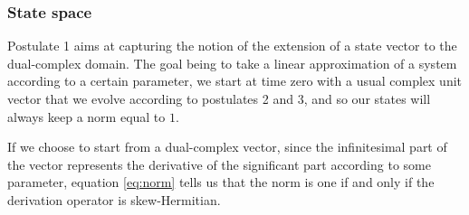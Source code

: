 \documentclass{article}
\newcommand{\R}{\mathbb{R}}
\newcommand{\e}{\epsilon}
\renewcommand{\Re}{\operatorname{Re}}
\newcommand\dstate[2]{\frac{\mathrm{d}\ket{#1}}{\mathrm{d}#2}}
\begin{document}
\subsubsection*{State space}

Postulate 1 aims at capturing the notion of the extension of a state vector to the dual-complex domain. The goal being to take a linear approximation of a system according to a certain parameter, we start at time zero with a usual complex unit vector that we evolve according to postulates 2 and 3, and so our states will always keep a norm equal to $1$.

If we choose to start from a dual-complex vector, since the infinitesimal part of the vector represents the derivative of the significant part according to some parameter, equation \ref{eq:norm} tells us that the norm is one if and only if the derivation operator is skew-Hermitian.
%
%
%
%
%
\end{document}
